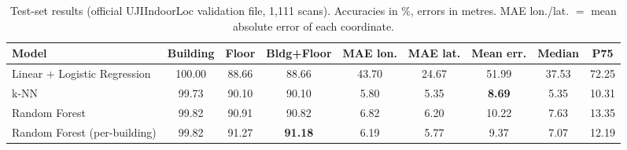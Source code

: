 \begin{table}[t]
\centering
\caption{Test-set results (official UJIIndoorLoc validation file, 1{,}111 scans). Accuracies in \%, errors in metres. MAE lon./lat. $=$ mean absolute error of each coordinate.}
\label{tab:main}
\begin{tabular}{lcccccccc}
\toprule
Model & Building & Floor & Bldg+Floor & MAE lon. & MAE lat. & Mean err. & Median & P75 \\
\midrule
Linear + Logistic Regression & 100.00 & 88.66 & 88.66 & 43.70 & 24.67 & 51.99 & 37.53 & 72.25 \\
k-NN & 99.73 & 90.10 & 90.10 & 5.80 & 5.35 & \textbf{8.69} & 5.35 & 10.31 \\
Random Forest & 99.82 & 90.91 & 90.82 & 6.82 & 6.20 & 10.22 & 7.63 & 13.35 \\
Random Forest (per-building) & 99.82 & 91.27 & \textbf{91.18} & 6.19 & 5.77 & 9.37 & 7.07 & 12.19 \\
\bottomrule
\end{tabular}
\end{table}
